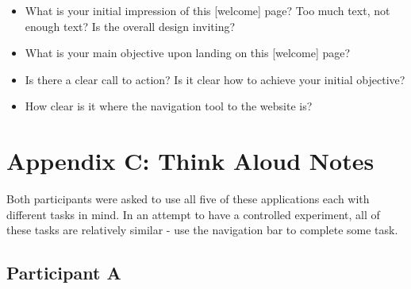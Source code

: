 \begin{itemize}
\item
  What is your initial impression of this [welcome] page? Too much text, not enough text? Is the overall design inviting?
\item
  What is your main objective upon landing on this [welcome] page?
\item
  Is there a clear call to action? Is it clear how to achieve your initial objective?
\item
  How clear is it where the navigation tool to the website is?
\end{itemize}


\section{Appendix C: Think Aloud Notes}
 Both participants were asked to use all five of these applications each with different tasks in mind. In an attempt to have a controlled experiment, all of these tasks are relatively similar - use the navigation bar to complete some task.

\subsection{Participant A}

